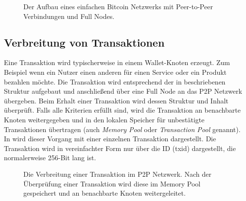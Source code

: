 \documentclass[ngerman,runningheads,a4paper]{llncs}[2018/03/10]
\begin{document}
\begin{figure}
  \centering
  \caption{Der Aufbau eines einfachen Bitcoin Netzwerks mit Peer-to-Peer Verbindungen und Full Nodes.}
  \label{fig:basicNetwork}
\end{figure}

\subsection{Verbreitung von Transaktionen}\label{sec:transaktionsverbreitung}

Eine Transaktion wird typischerweise in einem Wallet-Knoten erzeugt. Zum Beispiel wenn ein Nutzer einen anderen für einen Service oder ein Produkt bezahlen möchte. Die Transaktion wird entsprechend der in  beschriebenen Struktur aufgebaut und anschließend über eine Full Node an das P2P Netzwerk übergeben. Beim Erhalt einer Transaktion wird dessen Struktur und Inhalt überprüft. Falls alle Kriterien erfüllt sind, wird die Transaktion an benachbarte Knoten weitergegeben und in den lokalen Speicher für unbestätigte Transaktionen übertragen (auch \textit{Memory Pool} oder \textit{Transaction Pool} genannt). In  wird dieser Vorgang mit einer einzelnen Transaktion dargestellt. Die Transaktion wird in vereinfachter Form nur über die ID (txid) dargestellt, die normalerweise 256-Bit lang ist.

\begin{figure}
  \centering
  \caption{Die Verbreitung einer Transaktion im P2P Netzwerk. Nach der Überprüfung einer Transaktion wird diese im Memory Pool gespeichert und an benachbarte Knoten weitergeleitet.}
  \label{fig:transactionPropagation}
\end{figure}
\end{document}
